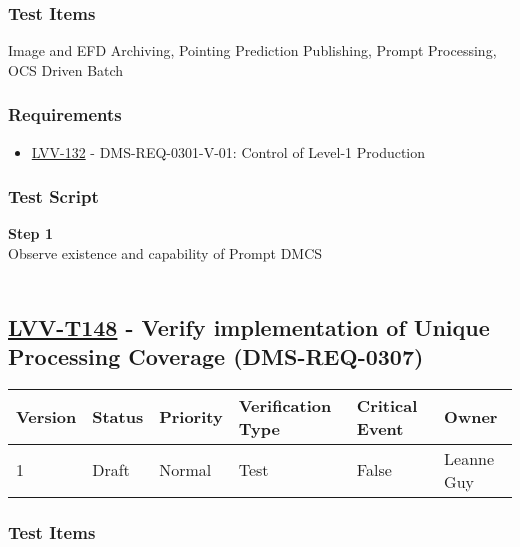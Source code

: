 \hypertarget{test-items-123}{%
\subsubsection{Test Items}\label{test-items-123}}

Image and EFD Archiving, Pointing Prediction Publishing, Prompt
Processing, OCS Driven Batch~

\hypertarget{requirements-124}{%
\subsubsection{Requirements}\label{requirements-124}}

\begin{itemize}
\tightlist
\item
  \href{https://jira.lsstcorp.org/browse/LVV-132}{LVV-132} -
  DMS-REQ-0301-V-01: Control of Level-1 Production
\end{itemize}

\hypertarget{test-script-124}{%
\subsubsection{Test Script}\label{test-script-124}}

\textbf{Step 1}\\
Observe existence and capability of Prompt DMCS\\
~\\

\hypertarget{lvv-t148---verify-implementation-of-unique-processing-coverage-dms-req-0307}{%
\subsection{\texorpdfstring{\href{https://jira.lsstcorp.org/secure/Tests.jspa\#/testCase/LVV-T148}{LVV-T148}
- Verify implementation of Unique Processing Coverage
(DMS-REQ-0307)}{LVV-T148 - Verify implementation of Unique Processing Coverage (DMS-REQ-0307)}}\label{lvv-t148---verify-implementation-of-unique-processing-coverage-dms-req-0307}}

\begin{longtable}[]{@{}llllll@{}}
\toprule
Version & Status & Priority & Verification Type & Critical Event &
Owner\tabularnewline
\midrule
\endhead
1 & Draft & Normal & Test & False & Leanne Guy\tabularnewline
\bottomrule
\end{longtable}

\hypertarget{test-items-124}{%
\subsubsection{Test Items}\label{test-items-124}}

